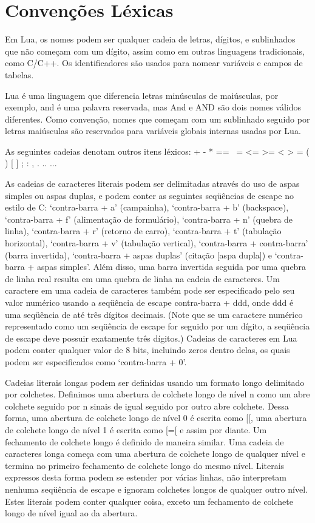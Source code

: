 \documentclass[
12pt, %
openright, %
oneside, %
a4paper, %
english, %
brazil, %
]{abntex2}
\begin{document}
\section{Convenções Léxicas}
Em Lua, os nomes podem ser qualquer cadeia de letras, dígitos, e sublinhados que não começam com um dígito, assim como em outras linguagens tradicionais, como C/C++. Os identificadores são usados para nomear variáveis e campos de tabelas.

Lua é uma linguagem que diferencia letras minúsculas de maiúsculas, por exemplo, and é uma palavra reservada, mas And e AND são dois nomes válidos diferentes. Como convenção, nomes que começam com um sublinhado seguido por letras maiúsculas são reservados para variáveis globais internas usadas por Lua.

As seguintes cadeias denotam outros itens léxicos:
+ - * == ~= <= >= < > = ( ) { } [ ] ; : , . .. ...

As cadeias de caracteres literais podem ser delimitadas através do uso de aspas simples ou aspas duplas, e podem conter as seguintes seqüências de escape no estilo de C: `contra-barra + a' (campainha), `contra-barra + b' (backspace), `contra-barra + f' (alimentação de formulário), `contra-barra + n' (quebra de linha), `contra-barra + r' (retorno de carro), `contra-barra + t' (tabulação horizontal), `contra-barra + v' (tabulação vertical), `contra-barra + contra-barra' (barra invertida), `contra-barra + aspas duplas' (citação [aspa dupla]) e `contra-barra + aspas simples'. Além disso, uma barra invertida seguida por uma quebra de linha real resulta em uma quebra de linha na cadeia de caracteres. Um caractere em uma cadeia de caracteres também pode ser especificado pelo seu valor numérico usando a seqüência de escape contra-barra + ddd, onde ddd é uma seqüência de até três dígitos decimais. (Note que se um caractere numérico representado como um seqüência de escape for seguido por um dígito, a seqüência de escape deve possuir exatamente três dígitos.) Cadeias de caracteres em Lua podem conter qualquer valor de 8 bits, incluindo zeros dentro delas, os quais podem ser especificados como `contra-barra + 0'.

Cadeias literais longas podem ser definidas usando um formato longo delimitado por colchetes. Definimos uma abertura de colchete longo de nível n como um abre colchete seguido por n sinais de igual seguido por outro abre colchete. Dessa forma, uma abertura de colchete longo de nível 0 é escrita como [[, uma abertura de colchete longo de nível 1 é escrita como [=[ e assim por diante. Um fechamento de colchete longo é definido de maneira similar. Uma cadeia de caracteres longa começa com uma abertura de colchete longo de qualquer nível e termina no primeiro fechamento de colchete longo do mesmo nível. Literais expressos desta forma podem se estender por várias linhas, não interpretam nenhuma seqüência de escape e ignoram colchetes longos de qualquer outro nível. Estes literais podem conter qualquer coisa, exceto um fechamento de colchete longo de nível igual ao da abertura.
\end{document}
